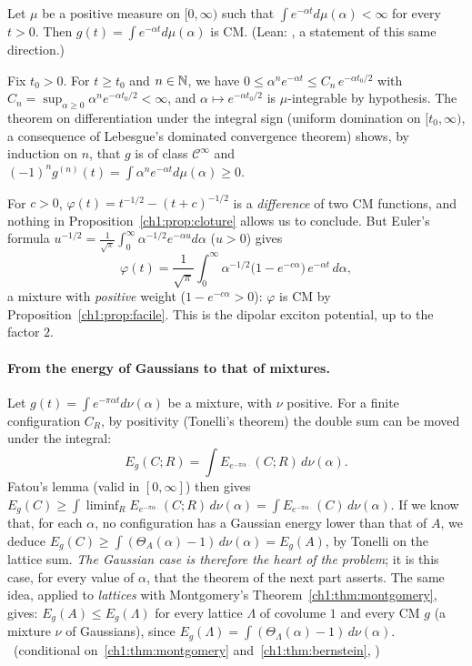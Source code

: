 \begin{proposition}\label{ch1:prop:facile}
Let $\mu$ be a positive measure on $[0,\infty)$ such that $\int e^{-\alpha t}d\mu(\alpha)<\infty$ for every $t>0$. Then $g(t)=\int e^{-\alpha t}d\mu(\alpha)$ is CM.
\tierC{} (Lean:  \tierA{}, a statement of this same direction.)
\end{proposition}

\begin{humanproof}
Fix $t_0>0$. For $t\ge t_0$ and $n\in\mathbb{N}$, we have $0\le\alpha^ne^{-\alpha t}\le C_n\,e^{-\alpha t_0/2}$ with
$C_n=\sup_{\alpha\ge0}\alpha^ne^{-\alpha t_0/2}<\infty$, and $\alpha\mapsto e^{-\alpha t_0/2}$ is $\mu$-integrable by hypothesis. The theorem on differentiation under the
integral sign (uniform domination on $[t_0,\infty)$, a consequence of Lebesgue's dominated convergence theorem) shows, by induction on $n$, that $g$ is of class $\mathcal C^\infty$ and
$(-1)^ng^{(n)}(t)=\int\alpha^ne^{-\alpha t}d\mu(\alpha)\ge0$.
\end{humanproof}

\begin{example}\label{ch1:ex:dipole}
For $c>0$, $\varphi(t)=t^{-1/2}-(t+c)^{-1/2}$ is a \emph{difference} of two CM functions, and nothing in Proposition~\ref{ch1:prop:cloture}
allows us to conclude. But Euler's formula $u^{-1/2}=\frac{1}{\sqrt\pi}\int_0^\infty \alpha^{-1/2}e^{-\alpha u}d\alpha$ ($u>0$) gives
\[
  \varphi(t)=\frac{1}{\sqrt\pi}\int_0^\infty\alpha^{-1/2}\bigl(1-e^{-c\alpha}\bigr)\,e^{-\alpha t}\,d\alpha ,
\]
a mixture with \emph{positive} weight ($1-e^{-c\alpha}>0$): $\varphi$ is CM by Proposition~\ref{ch1:prop:facile}. This is the dipolar exciton potential,
up to the factor $2$. \tierC{}
\end{example}

\paragraph{From the energy of Gaussians to that of mixtures.} Let $g(t)=\int e^{-\pi\alpha t}d\nu(\alpha)$ be a mixture, with $\nu$ positive.
For a finite configuration $C_R$, by positivity (Tonelli's theorem) the double sum can be moved under the integral:
\[
  E_g(C;R)=\int E_{e^{-\pi\alpha\,\cdot}}(C;R)\,d\nu(\alpha).
\]
Fatou's lemma (valid in $[0,\infty]$) then gives $E_g(C)\ge\int\liminf_RE_{e^{-\pi\alpha\cdot}}(C;R)\,d\nu(\alpha)=\int E_{e^{-\pi\alpha\cdot}}(C)\,d\nu(\alpha)$.
If we know that, for each $\alpha$, no configuration has a Gaussian energy lower than that of $A$, we deduce
$E_g(C)\ge\int(\Theta_A(\alpha)-1)\,d\nu(\alpha)=E_g(A)$, by Tonelli on the lattice sum. \tierC{}
\emph{The Gaussian case is therefore the heart of the problem}; it is this case, for every value of $\alpha$, that the theorem of the next part asserts.
The same idea, applied to \emph{lattices} with Montgomery's Theorem~\ref{ch1:thm:montgomery}, gives: $E_g(A)\le E_g(\Lambda)$ for every lattice $\Lambda$ of
covolume $1$ and every CM $g$ (a mixture $\nu$ of Gaussians), since $E_g(\Lambda)=\int(\Theta_\Lambda(\alpha)-1)\,d\nu(\alpha)$. \tierC{}\ (conditional on~\ref{ch1:thm:montgomery} and~\ref{ch1:thm:bernstein}, \tierL{})

